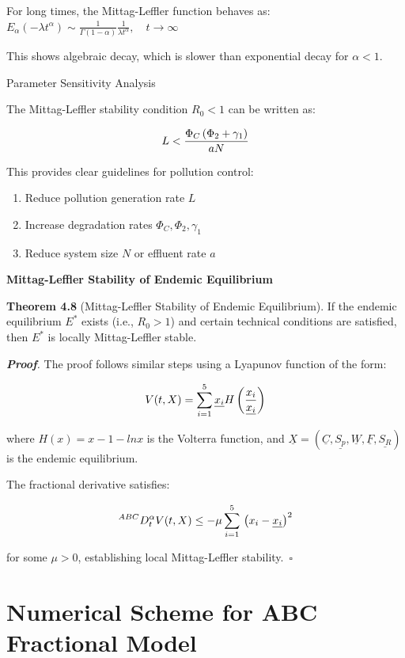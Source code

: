 \documentclass[10pt]{NSP1}
\newcommand{\fitwidth}[1]{\resizebox{\ifdim\width>\linewidth\linewidth\else\width\fi}{!}{#1}}
\begin{document}
For long times, the Mittag-Leffler function behaves as: \(E_{\alpha}\left( - \lambda t^{\alpha} \right) \sim \frac{1}{\Gamma(1 - \alpha)}\frac{1}{\lambda t^{\alpha}},\quad t \rightarrow \infty\)

This shows algebraic decay, which is slower than exponential decay for \(\alpha < 1\).

Parameter Sensitivity Analysis

The Mittag-Leffler stability condition \(R_{0} < 1\) can be written as:

\[
\fitwidth{$\displaystyle L < \frac{\Phi_{C}\left( \Phi_{2} + \gamma_{1} \right)}{aN}$}
\]

This provides clear guidelines for pollution control:

\begin{enumerate}
\def\labelenumi{\arabic{enumi}.}
\item
  Reduce pollution generation rate \(L\)
\item
  Increase degradation rates \(\Phi_{C},\Phi_{2},\gamma_{1}\)
\item
  Reduce system size \(N\) or effluent rate \(a\)
\end{enumerate}

\textbf{Mittag-Leffler Stability of Endemic Equilibrium}

\textbf{Theorem 4.8} (Mittag-Leffler Stability of Endemic Equilibrium). If the endemic equilibrium \(E^{*}\) exists (i.e., \(R_{0} > 1\)) and certain technical conditions are satisfied, then \(E^{*}\) is locally Mittag-Leffler stable.

\emph{\textbf{Proof}.} The proof follows similar steps using a Lyapunov function of the form:

\[
\fitwidth{$\displaystyle V(t,X) = \sum_{i = 1}^{5}{}\underline{x_{i}}H\left( \frac{x_{i}}{\underline{x_{i}}} \right)$}
\]

where \(H(x) = x - 1 - lnx\) is the Volterra function, and \(\underline{X} = \left( \underline{C},\underline{S_{p}},\underline{W},\underline{F},\underline{S_{R}} \right)\) is the endemic equilibrium.

The fractional derivative satisfies:

\[
\fitwidth{$\displaystyle ^{ABC}D_{t}^{\alpha}V(t,X) \leq - \mu\sum_{i = 1}^{5}{}\left( x_{i} - \underline{x_{i}} \right)^{2}$}
\]

for some \(\mu > 0\), establishing local Mittag-Leffler stability.~$\square$

\section{Numerical Scheme for ABC Fractional Model}
\end{document}
